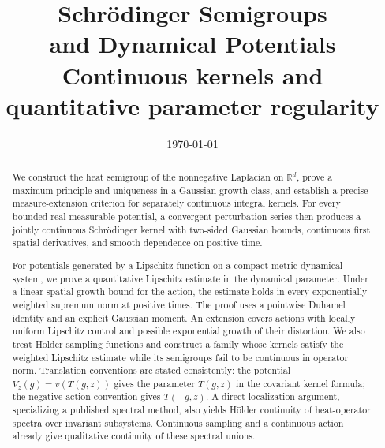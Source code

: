 
\renewcommand{\thechapter}{\arabic{chapter}}
\renewcommand{\chaptername}{Chapter}

\title{Schr\"odinger Semigroups\\and Dynamical Potentials\\
\large Continuous kernels and quantitative parameter regularity}
\date{\today}


\maketitle
\begin{abstract}
We construct the heat semigroup of the nonnegative Laplacian on
$\mathbb R^d$, prove a maximum principle and uniqueness in a Gaussian
growth class, and establish a precise measure-extension criterion for
separately continuous integral kernels. For every bounded real measurable
potential, a convergent perturbation series then produces a jointly
continuous Schr\"odinger kernel with two-sided Gaussian bounds, continuous
first spatial derivatives, and smooth dependence on positive time.

For potentials generated by a Lipschitz function on a compact metric
dynamical system, we prove a quantitative Lipschitz estimate in the
dynamical parameter. Under a linear spatial growth bound for the action,
the estimate holds in every exponentially weighted supremum norm at
positive times. The proof uses a pointwise Duhamel identity and an explicit
Gaussian moment. An extension covers actions with locally uniform
Lipschitz control and possible exponential growth of their distortion. We also treat Hölder sampling functions and construct
a family whose kernels satisfy the weighted Lipschitz estimate while
its semigroups fail to be continuous in operator norm. Translation
conventions are stated consistently:
the potential $V_z(g)=v(T(g,z))$ gives the parameter $T(g,z)$ in the
covariant kernel formula; the negative-action convention gives $T(-g,z)$. A direct localization argument, specializing a published spectral method,
also yields H\"older continuity of heat-operator spectra over invariant
subsystems. Continuous sampling and a continuous action already give
qualitative continuity of these spectral unions.
\end{abstract}

